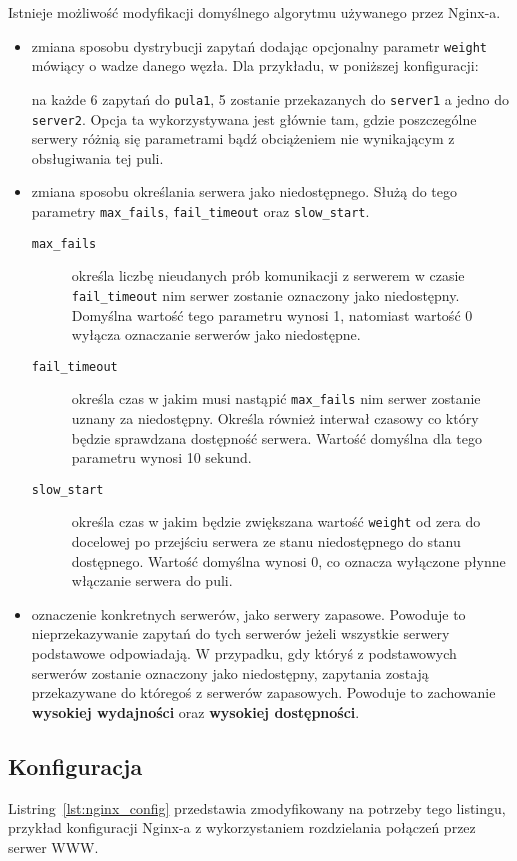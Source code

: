 {Istnieje możliwość modyfikacji domyślnego algorytmu używanego przez Nginx-a.
\begin{itemize}
	\item zmiana sposobu dystrybucji zapytań dodając opcjonalny parametr \texttt{weight} mówiący o wadze danego węzła. Dla przykładu, w poniższej konfiguracji:
		
	na każde 6 zapytań do \texttt{pula1}, 5 zostanie przekazanych do \texttt{server1} a jedno do \texttt{server2}.
	Opcja ta wykorzystywana jest głównie tam, gdzie poszczególne serwery różnią się parametrami bądź obciążeniem nie wynikającym z obsługiwania tej puli.
	\item zmiana sposobu określania serwera jako niedostępnego.
	Służą do tego parametry \texttt{max\_fails}, \texttt{fail\_timeout} oraz \texttt{slow\_start}.\\
	\begin{description}
	\item[\texttt{max\_fails}] określa liczbę nieudanych prób komunikacji z serwerem w czasie \texttt{fail\_timeout} nim serwer zostanie oznaczony jako niedostępny.
	Domyślna wartość tego parametru wynosi 1, natomiast wartość 0 wyłącza oznaczanie serwerów jako niedostępne.
	\item[\texttt{fail\_timeout}] określa czas w jakim musi nastąpić \texttt{max\_fails} nim serwer zostanie uznany za niedostępny.
	Określa również interwał czasowy co który będzie sprawdzana dostępność serwera.
	Wartość domyślna dla tego parametru wynosi 10 sekund.
	\item[\texttt{slow\_start}] określa czas w jakim będzie zwiększana wartość \texttt{weight} od zera do docelowej po przejściu serwera ze stanu niedostępnego do stanu dostępnego.
	Wartość domyślna wynosi 0, co oznacza wyłączone płynne włączanie serwera do puli.
	\end{description}
	\item oznaczenie konkretnych serwerów, jako serwery zapasowe.  
	Powoduje to nieprzekazywanie zapytań do tych serwerów jeżeli wszystkie serwery podstawowe odpowiadają.
	W przypadku, gdy któryś z podstawowych serwerów zostanie oznaczony jako niedostępny, zapytania zostają przekazywane do któregoś z serwerów zapasowych.
	Powoduje to zachowanie \textbf{wysokiej wydajności} oraz \textbf{wysokiej dostępności}.	
\end{itemize}
\subsection{Konfiguracja}
Listring~\ref{lst:nginx_config} przedstawia zmodyfikowany na potrzeby tego listingu, przykład konfiguracji Nginx-a z wykorzystaniem rozdzielania połączeń przez serwer WWW.

}
